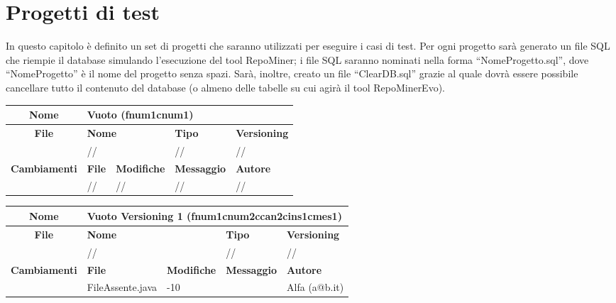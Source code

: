 \chapter{Progetti di test}
In questo capitolo è definito un set di progetti che saranno utilizzati per eseguire i casi di test. Per ogni progetto sarà generato un file SQL che riempie il database simulando l'esecuzione del tool RepoMiner; i file SQL saranno nominati nella forma ``NomeProgetto.sql'', dove ``NomeProgetto'' è il nome del progetto senza spazi. Sarà, inoltre, creato un file ``ClearDB.sql'' grazie al quale dovrà essere possibile cancellare tutto il contenuto del database (o almeno delle tabelle su cui agirà il tool RepoMinerEvo).

\begin{table}[ht]
\footnotesize
\begin{tabular}{|c|p{2.5cm}|p{2cm}|p{2.5cm}|p{2.5cm}|}
  \hline
  \textbf{Nome}	& \multicolumn{4}{l|}{Vuoto (fnum1cnum1)} 												\\
  \hline
  \rowcolor{lightgray}\textbf{File} 		& \multicolumn{2}{l|}{\textbf{Nome}}		& \textbf{Tipo}		& \textbf{Versioning} 		\\
						\cline{2-5}
						& \multicolumn{2}{l|}{//}			& //			& //				\\
  \hline
  \rowcolor{lightgray}\textbf{Cambiamenti}	& \textbf{File}		&\textbf{Modifiche}	& \textbf{Messaggio}	& \textbf{Autore}		\\
						\cline{2-5}
						& //			& //  			& //			& //				\\
  \hline
\end{tabular}
\end{table}

\begin{table}[ht]
\footnotesize
\begin{tabular}{|c|p{2.5cm}|p{2cm}|p{2.5cm}|p{2.5cm}|}
  \hline
  \textbf{Nome}	& \multicolumn{4}{l|}{Vuoto Versioning 1 (fnum1cnum2ccan2cins1cmes1)} 									\\
  \hline
  \rowcolor{lightgray}\textbf{File} 		& \multicolumn{2}{l|}{\textbf{Nome}}		& \textbf{Tipo}		& \textbf{Versioning} 		\\
						\cline{2-5}
						& \multicolumn{2}{l|}{//}			& //			& //				\\
  \hline
  \rowcolor{lightgray}\textbf{Cambiamenti}	& \textbf{File}		&\textbf{Modifiche}	& \textbf{Messaggio}	& \textbf{Autore}		\\
						\cline{2-5}
						& FileAssente.java	& -10	  		& 			& Alfa (a@b.it)			\\
  \hline
\end{tabular}
\end{table}


